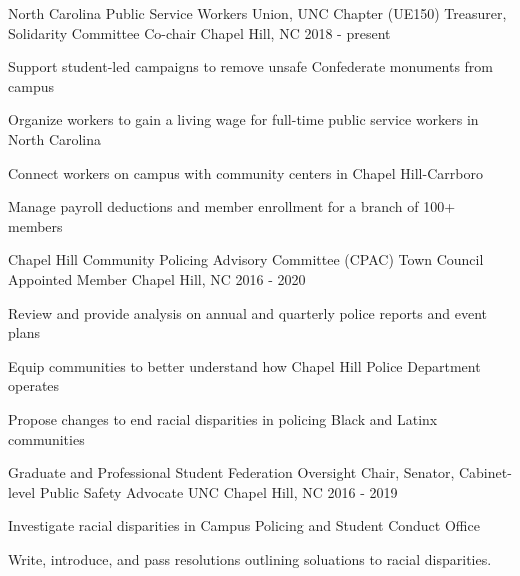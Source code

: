 
\begin{cventries}

  \cventry
    {North Carolina Public Service Workers Union, UNC Chapter (UE150)} %
    {Treasurer, Solidarity Committee Co-chair} %
    {Chapel Hill, NC} %
    {2018 - present} %
    {
      \begin{cvitems} %
        \item {Support student-led campaigns to remove unsafe Confederate monuments from campus}
        \item {Organize workers to gain a living wage for full-time public service workers in North Carolina}
        \item {Connect workers on campus with community centers in Chapel Hill-Carrboro}
        \item {Manage payroll deductions and member enrollment for a branch of 100+ members}
      \end{cvitems}
    }
	
  \cventry
    {Chapel Hill Community Policing Advisory Committee (CPAC)} %
    {Town Council Appointed Member} %
    {Chapel Hill, NC} %
    {2016 - 2020} %
    {
      \begin{cvitems} %
        \item {Review and provide analysis on annual and quarterly police reports and event plans}
        \item {Equip communities to better understand how Chapel Hill Police Department operates}
        \item {Propose changes to end racial disparities in policing Black and Latinx communities}
      \end{cvitems}
    }

  \cventry
    {Graduate and Professional Student Federation} %
    {Oversight Chair, Senator, Cabinet-level Public Safety Advocate} %
    {UNC Chapel Hill, NC} %
    {2016 - 2019} %
    {
      \begin{cvitems} %
        \item {Investigate racial disparities in Campus Policing and Student Conduct Office}
        \item {Write, introduce, and pass resolutions outlining soluations to racial disparities.}
      \end{cvitems}
    }
	

\end{cventries}
